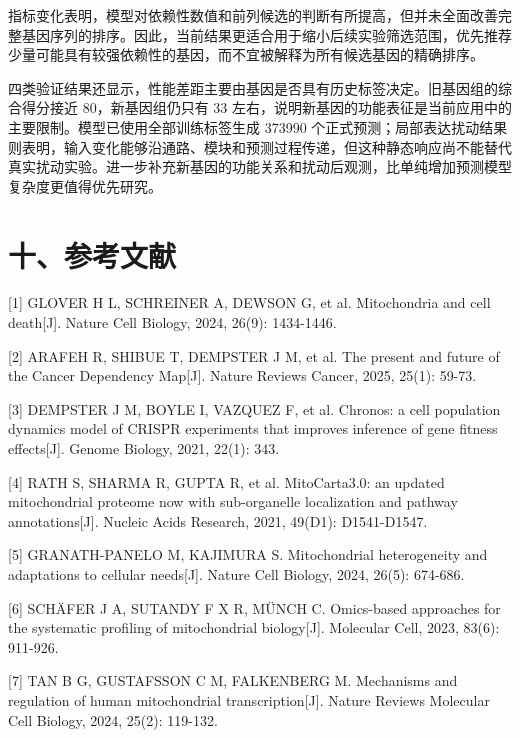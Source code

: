 指标变化表明，模型对依赖性数值和前列候选的判断有所提高，但并未全面改善完整基因序列的排序。因此，当前结果更适合用于缩小后续实验筛选范围，优先推荐少量可能具有较强依赖性的基因，而不宜被解释为所有候选基因的精确排序。

四类验证结果还显示，性能差距主要由基因是否具有历史标签决定。旧基因组的综合得分接近 80，新基因组仍只有 33 左右，说明新基因的功能表征是当前应用中的主要限制。模型已使用全部训练标签生成 373990 个正式预测；局部表达扰动结果则表明，输入变化能够沿通路、模块和预测过程传递，但这种静态响应尚不能替代真实扰动实验。进一步补充新基因的功能关系和扰动后观测，比单纯增加预测模型复杂度更值得优先研究\cite{ref21}。

\hypertarget{ux5341ux53c2ux8003ux6587ux732e}{%
\section{十、参考文献}\label{ux5341ux53c2ux8003ux6587ux732e}}




\iffalse

{[}1{]} GLOVER H L, SCHREINER A, DEWSON G, et al. Mitochondria and cell death{[}J{]}. Nature Cell Biology, 2024, 26(9): 1434-1446.

{[}2{]} ARAFEH R, SHIBUE T, DEMPSTER J M, et al. The present and future of the Cancer Dependency Map{[}J{]}. Nature Reviews Cancer, 2025, 25(1): 59-73.

{[}3{]} DEMPSTER J M, BOYLE I, VAZQUEZ F, et al. Chronos: a cell population dynamics model of CRISPR experiments that improves inference of gene fitness effects{[}J{]}. Genome Biology, 2021, 22(1): 343.

{[}4{]} RATH S, SHARMA R, GUPTA R, et al. MitoCarta3.0: an updated mitochondrial proteome now with sub-organelle localization and pathway annotations{[}J{]}. Nucleic Acids Research, 2021, 49(D1): D1541-D1547.

{[}5{]} GRANATH-PANELO M, KAJIMURA S. Mitochondrial heterogeneity and adaptations to cellular needs{[}J{]}. Nature Cell Biology, 2024, 26(5): 674-686.

{[}6{]} SCHÄFER J A, SUTANDY F X R, MÜNCH C. Omics-based approaches for the systematic profiling of mitochondrial biology{[}J{]}. Molecular Cell, 2023, 83(6): 911-926.

{[}7{]} TAN B G, GUSTAFSSON C M, FALKENBERG M. Mechanisms and regulation of human mitochondrial transcription{[}J{]}. Nature Reviews Molecular Cell Biology, 2024, 25(2): 119-132.

